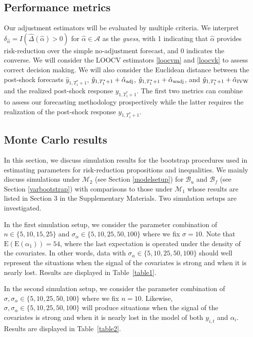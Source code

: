 \documentclass[11pt]{article}
\def\mc#1{\mathcal{#1}} %
\def\E#1{\mathrm{E}(#1)} %
\theoremstyle{definition}
\begin{document}
\subsection{Performance metrics}

Our adjustment estimators will be evaluated by multiple criteria. We interpret $\delta_{\hat{\alpha}}= I(\hat{\Delta}(\hat{\alpha})>0)$ for $\hat{\alpha}\in \mc{A}$ as the \emph{guess}, with 1 indicating that $\hat{\alpha}$ provides risk-reduction over the simple no-adjustment forecast, and 0 indicates the converse. We will consider the LOOCV estimators \eqref{loocvm} and \eqref{loocvk} to assess correct decision making. We will also consider the Euclidean distance between the post-shock forecasts $\hat{y}_{1,T_1^*+1}$, $\hat{y}_{1,T_1^*+1}+ \hat{\alpha}_{\rm adj}$, $\hat{y}_{1,T_1^*+1}+\hat{\alpha}_{\rm wadj}$, and $\hat{y}_{1,T_1^*+1}+\hat{\alpha}_{\rm IVW}$ and the realized post-shock response $y_{1,T_1^*+1}$. The first two metrics can combine to assess our forecasting methodology prospectively while the latter requires the realization of the post-shock response $y_{1,T_1^*+1}$. 



\subsection{Monte Carlo results}
\label{parametricbootstrapsimulation}

In this section, we discuss simulation results for the bootstrap procedures used in estimating parameters for risk-reduction propositions and inequalities. We mainly discuss simulations under $\mc{M}_2$ (see Section \ref{modelsetup}) for $\mc{B}_u$ and $\mc{B}_f$ (see Section \ref{varbootstrap}) with comparisons to those under $\mc{M}_1$ whose results are listed in Section 3 in the Supplementary Materials. Two simulation setups are investigated. 

In the first simulation setup, we consider the parameter combination of  $n \in \{5, 10, 15, 25\}$ and $\sigma_{\alpha} \in  \{5, 10, 25, 50, 100\}$ where we fix $\sigma=10$. Note that $\E{\E{\alpha_1}}=54$, where the last expectation is operated under the density of the covariates. In other words, data with $\sigma_{\alpha} \in  \{5, 10, 25, 50, 100\}$  should well represent the situations when the signal of the covariates is strong and when it is nearly lost. Results are displayed in Table~\ref{table1}.


In the second simulation setup, we consider the parameter combination of $\sigma, \sigma_{\alpha} \in  \{5, 10, 25, 50, 100\}$ where we fix $n=10$. Likewise, $\sigma, \sigma_{\alpha} \in  \{5, 10, 25, 50, 100\}$ will produce situations when the signal of the covariates is strong and when it is nearly lost in the model of  both $y_{i,t}$ and $\alpha_i$. Results are displayed in Table~\ref{table2}.
\end{document}

